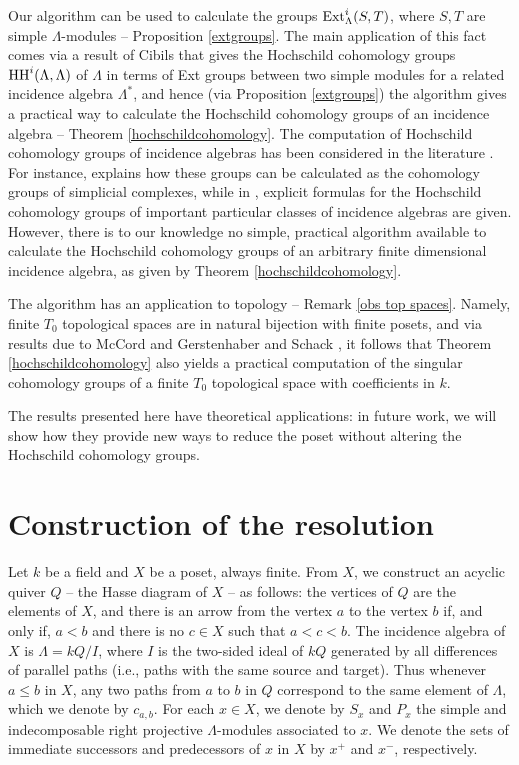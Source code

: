 \documentclass[preprint,review,12pt]{elsarticle}
\newcommand{\Ext}{{\textnormal{Ext}}}
\newcommand{\HH}{{\textnormal{HH}}}
\begin{document}
Our algorithm can be used to calculate the groups $\Ext^i_{\Lambda}(S,T)$, where $S,T$ are simple $\Lambda$-modules -- Proposition \ref{extgroups}.  The main application of this fact comes via a result of Cibils \cite[Proposition 2.1]{C89} that gives the Hochschild cohomology groups $\HH^i(\Lambda, \Lambda)$ of $\Lambda$ in terms of Ext groups between two simple modules for a related incidence algebra $\Lambda^*$, and hence (via Proposition \ref{extgroups}) the algorithm gives a practical way to calculate the Hochschild cohomology groups of an incidence algebra -- Theorem \ref{hochschildcohomology}.  The computation of Hochschild cohomology groups of incidence algebras has been considered in the literature \cite{GS83, C89, H89, IZ90, GR01}.  For instance, \cite{GS83} explains how these groups can be calculated as the cohomology groups of simplicial complexes, while in \cite{GR01}, explicit formulas for the Hochschild cohomology groups of important particular classes of incidence algebras are given.  However, there is to our knowledge no simple, practical algorithm available to calculate the Hochschild cohomology groups of an arbitrary finite dimensional incidence algebra, as given by Theorem \ref{hochschildcohomology}.

The algorithm has an application to topology -- Remark \ref{obs top spaces}.  Namely, finite $T_0$ topological spaces are in natural bijection with finite posets, and via results due to McCord \cite{M66} and Gerstenhaber and Schack \cite{GS83}, it follows that Theorem \ref{hochschildcohomology} also yields a practical computation of the singular cohomology groups of a finite $T_0$ topological space with coefficients in $k$. 

The results presented here have theoretical applications: in future work, we will show how they provide new ways to reduce the poset without altering the Hochschild cohomology groups.


\section{Construction of the resolution}\label{section construction of resolution}

Let $k$ be a field and $X$ be a poset, always finite.  From $X$, we construct an acyclic quiver $Q$ -- the Hasse diagram of $X$ -- as follows: the vertices of $Q$ are the elements of $X$, and there is an arrow from the vertex $a$ to the vertex $b$ if, and only if, $a<b$ and there is no $c\in X$ such that $a<c<b$.  The incidence algebra of $X$ is $\Lambda = kQ/I$, where $I$ is the two-sided ideal of $kQ$ generated by all differences of parallel paths (i.e., paths with the same source and target).  Thus whenever $a\leqslant b$ in $X$, any two paths from $a$ to $b$ in $Q$ correspond to the same element of $\Lambda$, which we denote by $c_{a,b}$.  For each $x\in X$, we denote by $S_x$ and $P_x$ the simple and indecomposable right projective $\Lambda$-modules associated to $x$. We denote the sets of immediate successors and predecessors of $x$ in $X$  by $x^+$ and $x^-$, respectively.
\end{document}
